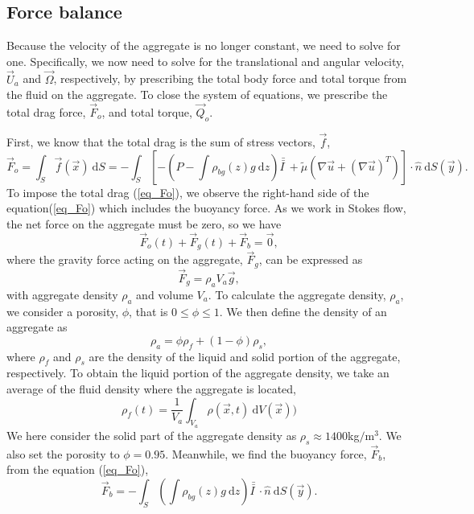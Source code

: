 \subsection{Force balance}
\label{sec:force_balance}
\par
Because the velocity of the aggregate is no longer constant, we need to solve for one.
Specifically, we now need to solve for the translational and angular velocity, $\vec{U}_a$ and $\vec{\Omega}$, respectively, by prescribing the total body force and total torque from the fluid on the aggregate.
To close the system of equations, we prescribe the total drag force, $\vec{F}_o$, and total torque, $\vec{Q}_o$. 

First, we know that the total drag is the sum of stress vectors, $\vec{f}$,
\begin{equation}
	 \vec{F}_o = \int_S \vec{f} (\vec{x}) \ \textrm{d}S 
	= - \int_S \left[ 
	 - \left( P -  \int \rho_{bg}(z) g \ \textrm{d}z \right) \bar{\bar{I \ }} 
	 + \tilde{\mu} \left( \nabla \vec{u} + (\nabla \vec{u})^{T} \right)
	 \right] \cdot \hat{n} \ \textrm{d}S (\vec{y}).
\label{eq_Fo}
\end{equation}
To impose the total drag (\ref{eq_Fo}), we observe the right-hand side of the equation(\ref{eq_Fo}) which includes the buoyancy force. 
As we work in Stokes flow, the net force on the aggregate must be zero, so we have
\begin{equation}
	\vec{F}_o (t)+\vec{F}_g(t) + \vec{F}_b = \vec{0},
\end{equation} 
where the gravity force acting on the aggregate, $\vec{F}_g$, can be expressed as
\begin{equation}
	\vec{F}_g = \rho_a V_a \vec{g}, 
\end{equation}
with aggregate density $\rho_a$ and volume $V_a$. 
To calculate the aggregate density, $\rho_a$, we consider a porosity, $\phi$, that is $ 0 \leq \phi \leq 1$.
 We then define the density of an aggregate as 
\begin{equation}
	\rho_a  = \phi \rho_{f} + (1-\phi) \rho_{s},
	\label{eq_rho_a}
\end{equation}
where $\rho_{f}$ and $\rho_s$ are the density of the liquid and solid portion of the aggregate, respectively. To obtain the liquid portion of the aggregate density, we take an average of the fluid density where the aggregate is located,
\begin{equation}
	\rho_{f}(t) = \frac{1}{V_a}\int_{V_a} \rho(\vec{x}, t) \  \textrm{d}V(\vec{x}))
\end{equation}
We here consider the solid part of the aggregate density as $\rho_s \approx 1400 $kg$/$m$^3.$ 
We also set the porosity to $\phi = 0.95$.
Meanwhile, we find the buoyancy force, $\vec{F}_b$, from the equation (\ref{eq_Fo}),
\begin{equation}
 \vec{F}_b =	  -  \int_S \left( 
	   \int \rho_{bg}(z) g \ \textrm{d}z 
	 \right) \bar{\bar{I \ }}  \cdot
	\hat{n} \ \textrm{d}S (\vec{y}).
\label{eq_Full_Force}
\end{equation}

